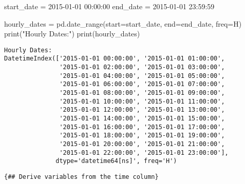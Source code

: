\documentclass[
  letterpaper,
  DIV=11,
  numbers=noendperiod]{scrreprt}
\newenvironment{Shaded}{\begin{snugshade}}{\end{snugshade}}
\newcommand{\BuiltInTok}[1]{\textcolor[rgb]{0.00,0.23,0.31}{#1}}
\newcommand{\NormalTok}[1]{\textcolor[rgb]{0.00,0.23,0.31}{#1}}
\newcommand{\OperatorTok}[1]{\textcolor[rgb]{0.37,0.37,0.37}{#1}}
\newcommand{\StringTok}[1]{\textcolor[rgb]{0.13,0.47,0.30}{#1}}
\begin{document}
\begin{Shaded}
\begin{Highlighting}[]
\NormalTok{start\_date }\OperatorTok{=} \StringTok{\textquotesingle{}2015{-}01{-}01 00:00:00\textquotesingle{}}
\NormalTok{end\_date }\OperatorTok{=} \StringTok{\textquotesingle{}2015{-}01{-}01 23:59:59\textquotesingle{}}

\NormalTok{hourly\_dates }\OperatorTok{=}\NormalTok{ pd.date\_range(start}\OperatorTok{=}\NormalTok{start\_date, end}\OperatorTok{=}\NormalTok{end\_date, freq}\OperatorTok{=}\StringTok{\textquotesingle{}H\textquotesingle{}}\NormalTok{)}
\BuiltInTok{print}\NormalTok{(}\StringTok{"Hourly Dates:"}\NormalTok{)}
\BuiltInTok{print}\NormalTok{(hourly\_dates)}
\end{Highlighting}
\end{Shaded}

\begin{verbatim}
Hourly Dates:
DatetimeIndex(['2015-01-01 00:00:00', '2015-01-01 01:00:00',
               '2015-01-01 02:00:00', '2015-01-01 03:00:00',
               '2015-01-01 04:00:00', '2015-01-01 05:00:00',
               '2015-01-01 06:00:00', '2015-01-01 07:00:00',
               '2015-01-01 08:00:00', '2015-01-01 09:00:00',
               '2015-01-01 10:00:00', '2015-01-01 11:00:00',
               '2015-01-01 12:00:00', '2015-01-01 13:00:00',
               '2015-01-01 14:00:00', '2015-01-01 15:00:00',
               '2015-01-01 16:00:00', '2015-01-01 17:00:00',
               '2015-01-01 18:00:00', '2015-01-01 19:00:00',
               '2015-01-01 20:00:00', '2015-01-01 21:00:00',
               '2015-01-01 22:00:00', '2015-01-01 23:00:00'],
              dtype='datetime64[ns]', freq='H')
\end{verbatim}

\texttt{\{\#\#\ Derive\ variables\ from\ the\ time\ column\}}

\begin{verbatim}
\end{verbatim}

\begin{verbatim}
\end{verbatim}

\begin{verbatim}
\end{verbatim}

\begin{Shaded}
\begin{Highlighting}[]

\end{Highlighting}
\end{Shaded}
\end{document}
